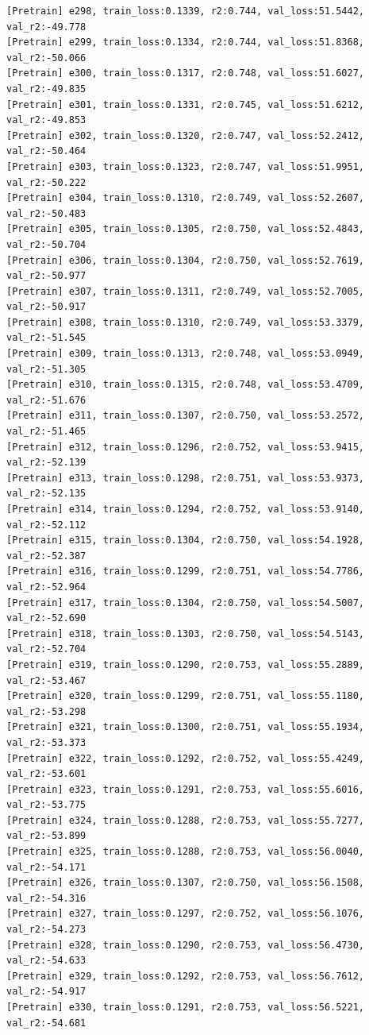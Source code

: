 \documentclass[a4paper, 12pt]{article}
\begin{document}
\begin{lstlisting}
[Pretrain] e298, train_loss:0.1339, r2:0.744, val_loss:51.5442, val_r2:-49.778
[Pretrain] e299, train_loss:0.1334, r2:0.744, val_loss:51.8368, val_r2:-50.066
[Pretrain] e300, train_loss:0.1317, r2:0.748, val_loss:51.6027, val_r2:-49.835
[Pretrain] e301, train_loss:0.1331, r2:0.745, val_loss:51.6212, val_r2:-49.853
[Pretrain] e302, train_loss:0.1320, r2:0.747, val_loss:52.2412, val_r2:-50.464
[Pretrain] e303, train_loss:0.1323, r2:0.747, val_loss:51.9951, val_r2:-50.222
[Pretrain] e304, train_loss:0.1310, r2:0.749, val_loss:52.2607, val_r2:-50.483
[Pretrain] e305, train_loss:0.1305, r2:0.750, val_loss:52.4843, val_r2:-50.704
[Pretrain] e306, train_loss:0.1304, r2:0.750, val_loss:52.7619, val_r2:-50.977
[Pretrain] e307, train_loss:0.1311, r2:0.749, val_loss:52.7005, val_r2:-50.917
[Pretrain] e308, train_loss:0.1310, r2:0.749, val_loss:53.3379, val_r2:-51.545
[Pretrain] e309, train_loss:0.1313, r2:0.748, val_loss:53.0949, val_r2:-51.305
[Pretrain] e310, train_loss:0.1315, r2:0.748, val_loss:53.4709, val_r2:-51.676
[Pretrain] e311, train_loss:0.1307, r2:0.750, val_loss:53.2572, val_r2:-51.465
[Pretrain] e312, train_loss:0.1296, r2:0.752, val_loss:53.9415, val_r2:-52.139
[Pretrain] e313, train_loss:0.1298, r2:0.751, val_loss:53.9373, val_r2:-52.135
[Pretrain] e314, train_loss:0.1294, r2:0.752, val_loss:53.9140, val_r2:-52.112
[Pretrain] e315, train_loss:0.1304, r2:0.750, val_loss:54.1928, val_r2:-52.387
[Pretrain] e316, train_loss:0.1299, r2:0.751, val_loss:54.7786, val_r2:-52.964
[Pretrain] e317, train_loss:0.1304, r2:0.750, val_loss:54.5007, val_r2:-52.690
[Pretrain] e318, train_loss:0.1303, r2:0.750, val_loss:54.5143, val_r2:-52.704
[Pretrain] e319, train_loss:0.1290, r2:0.753, val_loss:55.2889, val_r2:-53.467
[Pretrain] e320, train_loss:0.1299, r2:0.751, val_loss:55.1180, val_r2:-53.298
[Pretrain] e321, train_loss:0.1300, r2:0.751, val_loss:55.1934, val_r2:-53.373
[Pretrain] e322, train_loss:0.1292, r2:0.752, val_loss:55.4249, val_r2:-53.601
[Pretrain] e323, train_loss:0.1291, r2:0.753, val_loss:55.6016, val_r2:-53.775
[Pretrain] e324, train_loss:0.1288, r2:0.753, val_loss:55.7277, val_r2:-53.899
[Pretrain] e325, train_loss:0.1288, r2:0.753, val_loss:56.0040, val_r2:-54.171
[Pretrain] e326, train_loss:0.1307, r2:0.750, val_loss:56.1508, val_r2:-54.316
[Pretrain] e327, train_loss:0.1297, r2:0.752, val_loss:56.1076, val_r2:-54.273
[Pretrain] e328, train_loss:0.1290, r2:0.753, val_loss:56.4730, val_r2:-54.633
[Pretrain] e329, train_loss:0.1292, r2:0.753, val_loss:56.7612, val_r2:-54.917
[Pretrain] e330, train_loss:0.1291, r2:0.753, val_loss:56.5221, val_r2:-54.681

\end{lstlisting}
\end{document}
